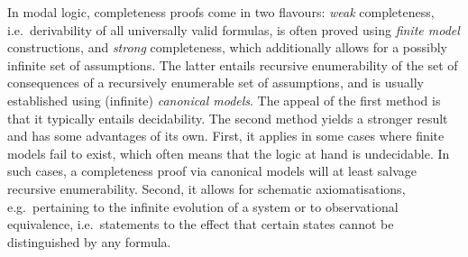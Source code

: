 \documentclass[proceedings]{stacs}
\theoremstyle{definition}
\theoremstyle{plain}
\begin{document}
\noindent In modal logic, completeness proofs come in two flavours:
\emph{weak} completeness, i.e.\ derivability of all universally
valid formulas,
is often proved using \emph{finite model} constructions, and
\emph{strong} completeness, which additionally allows for a possibly
infinite set of assumptions. The latter entails recursive
enumerability of the set of consequences of a recursively enumerable
set of assumptions, and is usually established using (infinite)
\emph{canonical models}. The appeal of the first method is that it
typically entails decidability.  The second method yields a stronger
result and has some advantages of its own. First, it applies in some
cases where finite models fail to exist, which often means that the
logic at hand is undecidable. In such cases, a completeness proof via
canonical models will at least salvage recursive
enumerability. Second, it allows for schematic axiomatisations, e.g.\
pertaining to the infinite evolution of a system or to observational
equivalence, i.e.\ statements to the effect that certain states cannot
be distinguished by any formula.
\end{document}
